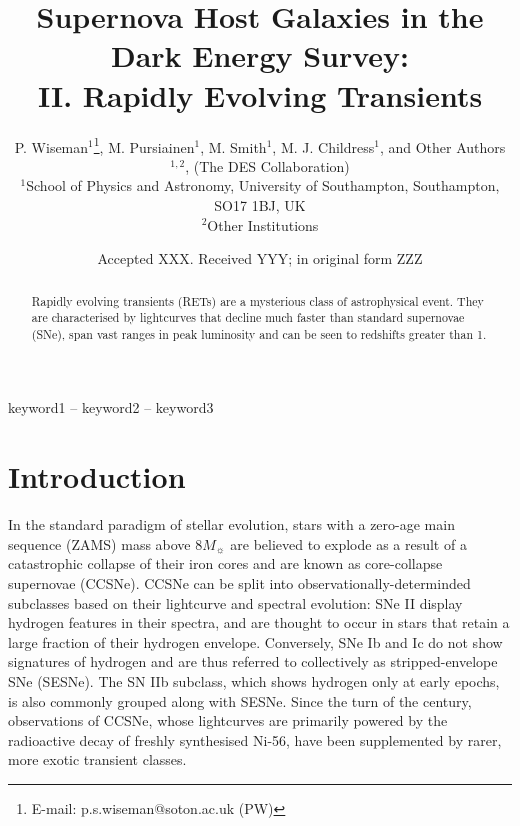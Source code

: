 \documentclass[fleqn,usenatbib,]{mnras}
\title[Supernova hosts in DES]{Supernova Host Galaxies in the Dark Energy Survey: \\ II. Rapidly Evolving Transients}
\author[P. Wiseman et al.]{
P. Wiseman$^1$\thanks{E-mail: p.s.wiseman@soton.ac.uk (PW)},
 M. Pursiainen$^1$,
 M. Smith$^1$,
 M. J. Childress$^1$,
 and Other Authors$^{1,2}$,
\newauthor
(The DES Collaboration)
\\
$^{1}$School of Physics and Astronomy, University of Southampton, Southampton, SO17 1BJ, UK\\
$^{2}$Other Institutions\\
}
\date{Accepted XXX. Received YYY; in original form ZZZ}
\begin{document}
\label{firstpage}
\pagerange{\pageref{firstpage}--\pageref{lastpage}}
\maketitle

\begin{abstract}
Rapidly evolving transients (RETs) are a mysterious class of astrophysical event. They are characterised by lightcurves that decline much faster than standard supernovae (SNe), span vast ranges in peak luminosity and can be seen to redshifts greater than 1. 
\end{abstract}

\begin{keywords}
keyword1 -- keyword2 -- keyword3
\end{keywords}



\section{Introduction}



In the standard paradigm of stellar evolution, stars with a zero-age main sequence (ZAMS) mass above $8M_{\sun}$ are believed to explode as a result of a catastrophic collapse of their iron cores and are known as core-collapse supernovae (CCSNe). CCSNe can be split into observationally-determinded subclasses based on their lightcurve and spectral evolution: SNe II display hydrogen features in their spectra, and are thought to occur in stars that retain a large fraction of their hydrogen envelope. Conversely, SNe Ib and Ic do not show signatures of hydrogen and are thus referred to collectively as stripped-envelope SNe (SESNe). The SN IIb subclass, which shows hydrogen only at early epochs, is also commonly grouped along with SESNe. Since the turn of the century, observations of CCSNe, whose lightcurves are primarily powered by the radioactive decay of freshly synthesised Ni-56, have been supplemented by rarer, more exotic transient classes.
\end{document}
